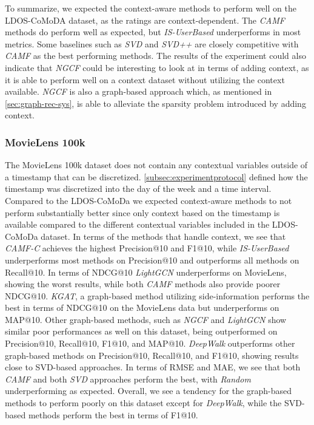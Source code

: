 To summarize, we expected the context-aware methods to perform well on the LDOS-CoMoDA dataset, as the ratings are context-dependent. 
The \textit{CAMF} methods do perform well as expected, but \textit{IS-UserBased} underperforms in most metrics.
Some baselines such as \textit{SVD} and \textit{SVD++} are closely competitive with \textit{CAMF} as the best performing methods.
The results of the experiment could also indicate that \textit{NGCF} could be interesting to look at in terms of adding context, as it is able to perform well on a context dataset without utilizing the context available. 
\textit{NGCF} is also a graph-based approach which, as mentioned in \autoref{sec:graph-rec-sys}, is able to alleviate the sparsity problem introduced by adding context.

\subsubsection{MovieLens 100k}
The MovieLens 100k dataset does not contain any contextual variables outside of a timestamp that can be discretized.
\autoref{subsec:experimentprotocol} defined how the timestamp was discretized into the day of the week and a time interval.
Compared to the LDOS-CoMoDa we expected context-aware methods to not perform substantially better since only context based on the timestamp is available compared to the different contextual variables included in the LDOS-CoMoDa dataset. 
In terms of the methods that handle context, we see that \textit{CAMF-C} achieves the highest Precision@10 and F1@10, while \textit{IS-UserBased} underperforms most methods on Precision@10 and outperforms all methods on Recall@10.
In terms of NDCG@10 \textit{LightGCN} underperforms on MovieLens, showing the worst results, while both \textit{CAMF} methods also provide poorer NDCG@10.
\textit{KGAT}, a graph-based method utilizing side-information performs the best in terms of NDCG@10 on the MovieLens data but underperforms on MAP@10.
Other graph-based methods, such as \textit{NGCF} and \textit{LightGCN} show similar poor performances as well on this dataset, being outperformed on Precision@10, Recall@10, F1@10, and MAP@10.
\textit{DeepWalk} outperforms other graph-based methods on Precision@10, Recall@10, and F1@10, showing results close to SVD-based approaches.
In terms of RMSE and MAE, we see that both \textit{CAMF} and both \textit{SVD} approaches perform the best, with \textit{Random} underperforming as expected.
Overall, we see a tendency for the graph-based methods to perform poorly on this dataset except for \textit{DeepWalk}, while the SVD-based methods perform the best in terms of F1@10.

